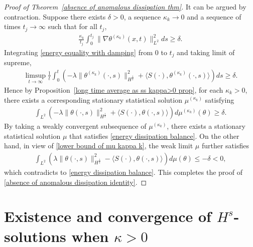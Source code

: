 \documentclass[reqno]{amsart}%
\theoremstyle{definition}
\theoremstyle{remark}
\numberwithin{equation}{section}
\newcommand{\1}{\mathbf{1}}
\numberwithin{equation}{section}
\numberwithin{theorem}{section}
\numberwithin{figure}{section}
\begin{document}
\begin{proof}[Proof of Theorem~\ref{absence of anomalous dissipation thm}]
It can be argued by contraction. Suppose there exists $\delta>0$, a sequence $\kappa_k\to0$ and a sequence of times $t_j\to\infty$ such that for all $t_j$,
\begin{align*}
\frac{\kappa_k}{t_j}\int_{0}^{t_j}\|\nabla\theta^{(\kappa_k)}(x,t)\|_{L^2}^2 ds\ge\delta.
\end{align*}
Integrating \eqref{energy equality with damping} from $0$ to $t_j$ and taking limit of supreme, 
\begin{align*}
\limsup_{t\to\infty}\frac{1}{t}\int_{0}^{t}\left(-\lambda\|\theta^{(\kappa_k)}(\cdot,s)\|_{H^\frac{1}{2}}^2+\langle S(\cdot),\theta^{(\kappa_k)}(\cdot,s)\rangle\right)ds\ge\delta.
\end{align*}
Hence by Proposition~\ref{long time average as ss kappa>0 prop}, for each $\kappa_k>0$, there exists a corresponding stationary statistical solution $\mu^{(\kappa_k)}$ satisfying
\begin{align}\label{lower bound of mu kappa k}
\int_{L^2}\left(-\lambda\|\theta(\cdot,s)\|_{H^\frac{1}{2}}^2+\langle S(\cdot),\theta(\cdot,s)\rangle\right)d\mu^{(\kappa_k)}(\theta)\ge\delta.
\end{align}
By taking a weakly convergent subsequence of $\mu^{(\kappa_k)}$, there exists a stationary statistical solution $\mu$ that satisfies \eqref{energy dissipation balance}. On the other hand, in view of \eqref{lower bound of mu kappa k}, the weak limit $\mu$ further satisfies
\begin{align*}
\int_{L^2}\left(\lambda\|\theta(\cdot,s)\|_{H^\frac{1}{2}}^2-\langle S(\cdot),\theta(\cdot,s)\rangle\right)d\mu(\theta)\le -\delta<0,
\end{align*}
which contradicts to \eqref{energy dissipation balance}. This completes the proof of \eqref{absence of anomalous dissipation identity}.
\end{proof}

\section{Existence and convergence of $H^s$-solutions when $\kappa>0$}\label{Existence and convergence of Hs-solutions section}
\end{document}
